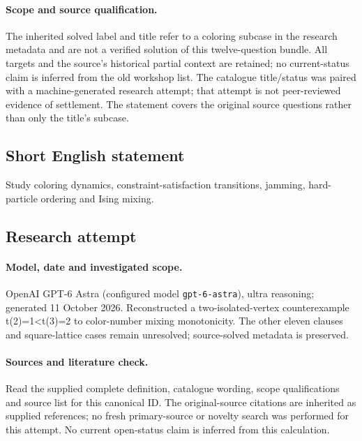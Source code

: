 \documentclass[11pt]{article}
\begin{document}
\paragraph{Scope and source qualification.}The inherited solved label and title refer to a coloring subcase in the research metadata and are not a verified solution of this twelve-question bundle. All targets and the source’s historical partial context are retained; no current-status claim is inferred from the old workshop list. The catalogue title/status was paired with a machine-generated research attempt; that attempt is not peer-reviewed evidence of settlement. The statement covers the original source questions rather than only the title’s subcase.
\subsection{Short English statement}
Study coloring dynamics, constraint-satisfaction transitions, jamming, hard-particle ordering and Ising mixing.
\subsection{Research attempt}
\paragraph{Model, date and investigated scope.}
OpenAI GPT-6 Astra (configured model \texttt{gpt-6-astra}), ultra reasoning; generated 11 October 2026. Reconstructed a two-isolated-vertex counterexample t(2)=1<t(3)=2 to color-number mixing monotonicity. The other eleven clauses and square-lattice cases remain unresolved; source-solved metadata is preserved.

\paragraph{Sources and literature check.}
Read the supplied complete definition, catalogue wording, scope qualifications and source list for this canonical ID. The original-source citations are inherited as supplied references; no fresh primary-source or novelty search was performed for this attempt. No current open-status claim is inferred from this calculation.
\end{document}
